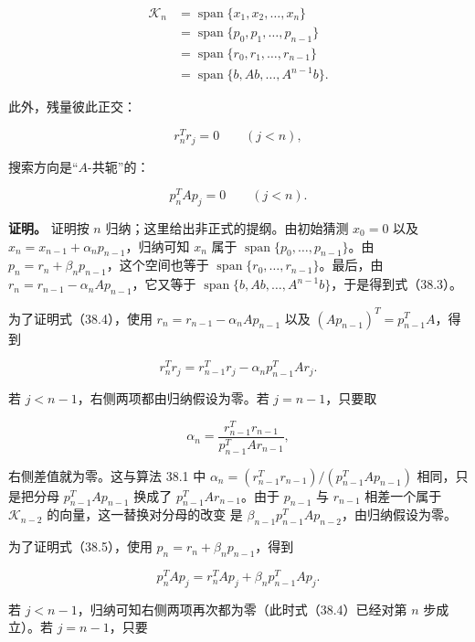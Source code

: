 \documentclass[UTF8,fontset=none,12pt]{ctexart}
\begin{document}
\begin{equation}
\begin{aligned}
\mathcal K_n
&=\operatorname{span}\{x_1,x_2,\ldots,x_n\}\\
&=\operatorname{span}\{p_0,p_1,\ldots,p_{n-1}\}\\
&=\operatorname{span}\{r_0,r_1,\ldots,r_{n-1}\}\\
&=\operatorname{span}\{b,Ab,\ldots,A^{n-1}b\}.
\end{aligned}
\tag{38.3}
\end{equation}

此外，残量彼此正交：

\begin{equation}
r_n^Tr_j=0\qquad(j<n),
\tag{38.4}
\end{equation}

搜索方向是“$A$-共轭”的：

\begin{equation}
p_n^TAp_j=0\qquad(j<n).
\tag{38.5}
\end{equation}

\textbf{证明。}
证明按 $n$ 归纳；这里给出非正式的提纲。由初始猜测 $x_0=0$ 以及
$x_n=x_{n-1}+\alpha_np_{n-1}$，归纳可知 $x_n$ 属于
$\operatorname{span}\{p_0,\ldots,p_{n-1}\}$。由
$p_n=r_n+\beta_np_{n-1}$，这个空间也等于
$\operatorname{span}\{r_0,\ldots,r_{n-1}\}$。最后，由
$r_n=r_{n-1}-\alpha_nAp_{n-1}$，它又等于
$\operatorname{span}\{b,Ab,\ldots,A^{n-1}b\}$，于是得到式（38.3）。

为了证明式（38.4），使用
$r_n=r_{n-1}-\alpha_nAp_{n-1}$ 以及
$(Ap_{n-1})^T=p_{n-1}^TA$，得到

\[
r_n^Tr_j=r_{n-1}^Tr_j-\alpha_np_{n-1}^TAr_j.
\]

若 $j<n-1$，右侧两项都由归纳假设为零。若 $j=n-1$，只要取

\[
\alpha_n=
\frac{r_{n-1}^Tr_{n-1}}{p_{n-1}^TAr_{n-1}},
\]

右侧差值就为零。这与算法 38.1 中
$\alpha_n=(r_{n-1}^Tr_{n-1})/(p_{n-1}^TAp_{n-1})$ 相同，只是把分母
$p_{n-1}^TAp_{n-1}$ 换成了 $p_{n-1}^TAr_{n-1}$。由于 $p_{n-1}$ 与
$r_{n-1}$ 相差一个属于 $\mathcal K_{n-2}$ 的向量，这一替换对分母的改变
是 $\beta_{n-1}p_{n-1}^TAp_{n-2}$，由归纳假设为零。

为了证明式（38.5），使用 $p_n=r_n+\beta_np_{n-1}$，得到

\[
p_n^TAp_j=r_n^TAp_j+\beta_np_{n-1}^TAp_j.
\]

若 $j<n-1$，归纳可知右侧两项再次都为零（此时式（38.4）已经对第 $n$
步成立）。若 $j=n-1$，只要
\end{document}
